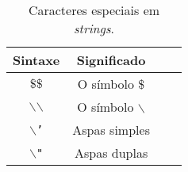 \begin{table}[h]
\caption{Caracteres especiais em \textit{strings}.}\label{tab:cap3-tipo-string}
\begin{center}
\begin{tabular}{|c|c|c|c|}
\hline
  \multicolumn{1}{|c|}{ \textbf{Sintaxe}}
&  \multicolumn{1}{|c|}{ \textbf{Significado}} \\
\hline
\hline
$\$\$$                      &  O símbolo \$ \\ \hline
$\backslash$$\backslash$    &  O símbolo $\backslash$ \\ \hline
$\backslash$\texttt{'}          &  Aspas simples \\ \hline
$\backslash$\texttt{"}          &  Aspas duplas \\ \hline
\end{tabular}
\end{center}
\end{table}